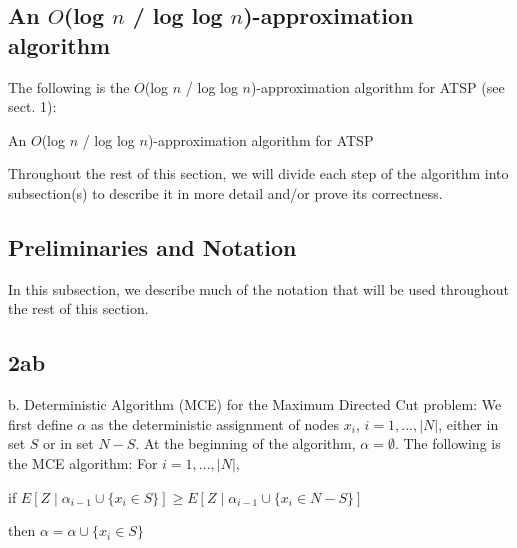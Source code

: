 \documentclass[oneside]{projectpaper} %
\begin{document}
\subsection{An $O$(log $n$ / log log $n$)-approximation algorithm}
The following is the $O$(log $n$ / log log $n$)-approximation algorithm for ATSP (see \cite{AGM10} sect. 1): 
\newline
\begin{algorithm}
\caption{An $O$(log $n$ / log log $n$)-approximation algorithm for ATSP}
\begin{algorithmic}
\end{algorithmic}
\end{algorithm}
\newline
Throughout the rest of this section, we will divide each step of the algorithm into subsection(s) to describe it in more detail and/or prove its correctness.
\subsection{Preliminaries and Notation}
In this subsection, we describe much of the notation that will be used throughout the rest of this section.
\subsection{2ab}
{\large b.} Deterministic Algorithm (MCE) for the Maximum Directed Cut problem:
\newline
We first define $\alpha$ as the deterministic assignment of nodes $x_i$, $i = 1,...,|N|$, either in set $S$ or in set $N-S$. At the beginning of the algorithm, $\alpha = \emptyset$. The following is the MCE algorithm:
\newline
For $i = 1,...,|N|$,  \newline

if $E[Z \mid \alpha_{i-1} \cup \{x_i \in S\}] \geq E[Z \mid \alpha_{i-1} \cup \{x_i \in N-S\}]$  \newline

\quad \quad then $\alpha = \alpha \cup \{x_i \in S\}$ \newline
\end{document}
